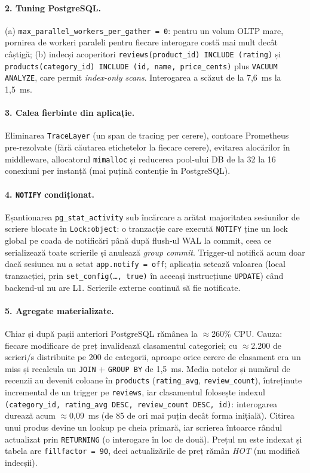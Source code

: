 \paragraph{2. Tuning PostgreSQL.} (a) \texttt{max\_parallel\_workers\_per\_gather = 0}: pentru un
volum OLTP mare, pornirea de workeri paraleli pentru fiecare interogare costă mai mult decât câștigă;
(b) indecși acoperitori \texttt{reviews(product\_id) INCLUDE (rating)} și
\texttt{products(category\_id) INCLUDE (id, name, price\_cents)} plus \texttt{VACUUM ANALYZE}, care
permit \emph{index-only scans}. Interogarea a scăzut de la 7{,}6~ms la 1{,}5~ms.

\paragraph{3. Calea fierbinte din aplicație.} Eliminarea \texttt{TraceLayer} (un span de tracing per
cerere), contoare Prometheus pre-rezolvate (fără căutarea etichetelor la fiecare cerere), evitarea
alocărilor în middleware, allocatorul \texttt{mimalloc} și reducerea pool-ului DB de la 32 la 16
conexiuni per instanță (mai puțină contenție în PostgreSQL).

\paragraph{4. \texttt{NOTIFY} condiționat.} Eșantionarea \texttt{pg\_stat\_activity} sub încărcare a arătat
majoritatea sesiunilor de scriere blocate în \texttt{Lock:object}: o tranzacție care execută
\texttt{NOTIFY} ține un lock global pe coada de notificări până după flush-ul WAL la commit, ceea ce
serializează toate scrierile și anulează \emph{group commit}. Trigger-ul notifică acum doar dacă sesiunea
nu a setat \texttt{app.notify = off}; aplicația setează valoarea (local tranzacției, prin
\texttt{set\_config(\ldots, true)} în aceeași instrucțiune \texttt{UPDATE}) când backend-ul nu are L1.
Scrierile externe continuă să fie notificate.

\paragraph{5. Agregate materializate.} Chiar și după pașii anteriori PostgreSQL rămânea la
$\approx$260\% CPU. Cauza: fiecare modificare de preț invalidează clasamentul categoriei; cu
$\approx$2.200 de scrieri/s distribuite pe 200 de categorii, aproape orice cerere de clasament era un miss
și recalcula un \texttt{JOIN} + \texttt{GROUP BY} de 1{,}5~ms. Media notelor și numărul de recenzii au
devenit coloane în \texttt{products} (\texttt{rating\_avg}, \texttt{review\_count}), întreținute incremental
de un trigger pe \texttt{reviews}, iar clasamentul folosește indexul
\texttt{(category\_id, rating\_avg DESC, review\_count DESC, id)}: interogarea durează acum
$\approx$0{,}09~ms (de 85 de ori mai puțin decât forma inițială). Citirea unui produs devine un lookup pe
cheia primară, iar scrierea întoarce rândul actualizat prin \texttt{RETURNING} (o interogare în loc de două).
Prețul nu este indexat și tabela are \texttt{fillfactor = 90}, deci actualizările de preț rămân
\emph{HOT} (nu modifică indecșii).

